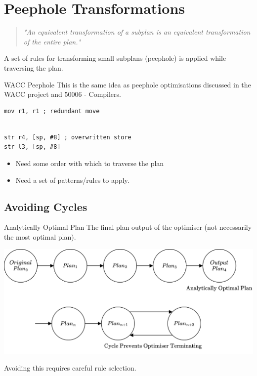 \section{Peephole Transformations}
\begin{quote}
    \textit{"An equivalent transformation of a subplan is an equivalent transformation of the entire plan."}
\end{quote}
A set of rules for transforming small subplans (peephole) is applied while traversing the plan.

\begin{sidenotebox}{WACC Peephole}
    This is the same idea as peephole optimisations discussed in the WACC project and 50006 - Compilers.
    \begin{minipage}{.49\textwidth}
        \begin{verbatim}
mov r1, r1 ; redundant move
        
        \end{verbatim}
    \end{minipage} \hfill \begin{minipage}{.49\textwidth}
        \begin{verbatim}
str r4, [sp, #8] ; overwritten store 
str l3, [sp, #8]
        \end{verbatim}
    \end{minipage}
\end{sidenotebox}

\begin{itemize}
    \item Need some order with which to traverse the plan
    \item Need a set of patterns/rules to apply.
\end{itemize}

\subsection{Avoiding Cycles}
\begin{definitionbox}{Analytically Optimal Plan}
    The final plan output of the optimiser (not necessarily the most optimal plan).
\end{definitionbox}
\begin{center}
    \includegraphics[width=.8\textwidth]{optimisation/images/optimiser_cycle.drawio.png}
\end{center}
Avoiding this requires careful rule selection.


